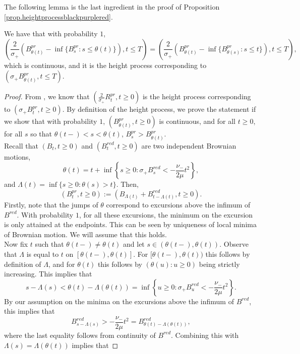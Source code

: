 The following lemma is the last ingredient in the proof of Proposition \ref{prop.heightprocessblackpurplered}.
\begin{lemma}\label{lemma.heightprocesstimechange}
We have that with probability $1$, $$\left(\frac{2}{\sigma_+} \left(B^{pr}_{\theta (t)}-\inf\{B^{pr}_{s}:s\leq \theta(t)\}\right), t\leq T \right)=\left(\frac{2}{\sigma_+} \left(B^{pr}_{\theta (t)}-\inf\{B^{pr}_{\theta(s)}:s\leq t\}\right), t\leq T \right),$$ which is continuous, and it is the height process corresponding to $\left(\sigma_+ B^{pr}_{\theta (t)},t\leq T\right)$. 
\end{lemma}
\begin{proof}
From \cite{Legall2005}, we know that $\left(\frac{2}{\sigma_+}R^{pr}_t,t\geq 0\right)$ is the height process corresponding to $\left(\sigma_+ B^{pr}_{t},t\geq 0\right)$. By definition of the height process, we prove the statement if we show that with probability $1$, $(B^{pr}_{\theta(t)},t\geq 0)$ is continuous, and for all $t\geq 0$, for all $s$ so that $\theta(t-)<s<\theta(t)$, $ B^{pr}_s > B^{pr}_{\theta(t)}$. \\
Recall that $(B_t, t \geq 0)$ and $(B^{red}_t, t\geq 0)$ are two independent Brownian motions, $$\theta(t)=t+\inf\left\{s\geq 0 : \sigma_+ B^{red}_s< -\frac{\nu_-}{2\mu} t^2\right\},$$ and $\Lambda(t)=\inf\{s\geq 0:\theta(s)> t\}$. Then, \begin{equation*}\left(B^{pr}_t,t \geq 0\right):=\left( B_{\Lambda(t)}+ B^{red}_{t-\Lambda(t)}, t\geq 0\right).\end{equation*}
Firstly, note that the jumps of $\theta$ correspond to excursions above the infimum of $B^{red}$.  With probability $1$, for all these excursions, the minimum on the excursion is only attained at the endpoints. This can be seen by uniqueness of local minima of Brownian motion. We will assume that this holds.\\
Now fix $t$ such that $\theta(t-)\neq \theta(t)$ and let $s\in (\theta(t-),\theta(t))$. Observe that $\Lambda$ is equal to $t$ on $[\theta(t-),\theta(t)]$. For $[\theta(t-),\theta(t))$ this follows by definition of $\Lambda$, and for $\theta(t)$ this follows by $(\theta(u):u\geq 0)$ being strictly increasing. This implies that $$s-\Lambda(s)<\theta(t)-\Lambda(\theta(t))=\inf\left\{ u\geq 0: \sigma_+ B_u^{red}<-\frac{\nu_-}{2\mu} t^2\right\}.$$ By our assumption on the minima on the excursions above the infimum of $B^{red}$, this implies that $$B^{red}_{s-\Lambda(s)}>-\frac{\nu_-}{2\mu} t^2=B^{red}_{\theta(t)-\Lambda(\theta(t))},$$
where the last equality follows from continuity of $B^{red}$. Combining this with $\Lambda(s)=\Lambda(\theta(t))$ implies that

\end{proof}
